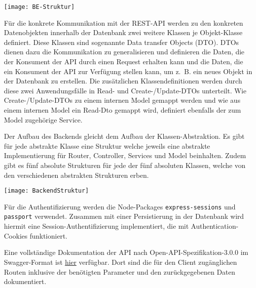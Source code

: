 \vspace{20pt}
\begin{center}
    \begin{minipage}{1\linewidth}
        \texttt{[image: BE-Struktur]}
    \end{minipage}
\end{center}
\vspace{20pt}

Für die konkrete Kommunikation mit der REST-API werden zu den konkreten Datenobjekten innerhalb der Datenbank zwei weitere Klassen je Objekt-Klasse definiert. Diese Klassen sind sogenannte Data transfer Objects (DTO). DTOs dienen dazu die Kommunikation zu generalisieren und definieren die Daten, die der Konsument der API durch einen Request erhalten kann und die Daten, die ein Konsument der API zur Verfügung stellen kann, um z. B. ein neues Objekt in der Datenbank zu erstellen. Die zusätzlichen Klassendefinitionen werden durch diese zwei Anwendungsfälle in Read- und Create-/Update-DTOs unterteilt. Wie Create-/Update-DTOs zu einem internen Model gemappt werden und wie aus einem internen Model ein Read-Dto gemappt wird, definiert ebenfalls der zum Model zugehörige Service.

Der Aufbau des Backends gleicht dem Aufbau der Klassen-Abstraktion. Es gibt für jede abstrakte Klasse eine Struktur welche jeweils eine abstrakte Implementierung für Router, Controller, Services und Model beinhalten.
Zudem gibt es fünf absolute Strukturen für jede der fünf absoluten Klassen, welche von den verschiedenen abstrakten Strukturen erben.

\vspace{20pt}
\begin{center}
    \begin{minipage}{0.7\linewidth}
        \texttt{[image: BackendStruktur]}
    \end{minipage}
\end{center}
\vspace{20pt}

Für die Authentifizierung werden die Node-Packages \verb|express-sessions| und \verb|passport| verwendet. Zusammen mit einer Persistierung in der Datenbank wird hiermit eine Session-Authentifizierung implementiert, die mit Authentication-Cookies funktioniert.

Eine vollständige Dokumentation der API nach Open-API-Spezifikation-3.0.0 im Swagger-Format ist \href{https://116.203.140.167.nip.io/api-docs/}{hier} verfügbar. Dort sind die für den Client zugänglichen Routen inklusive der benötigten Parameter und den zurückgegebenen Daten dokumentiert.

